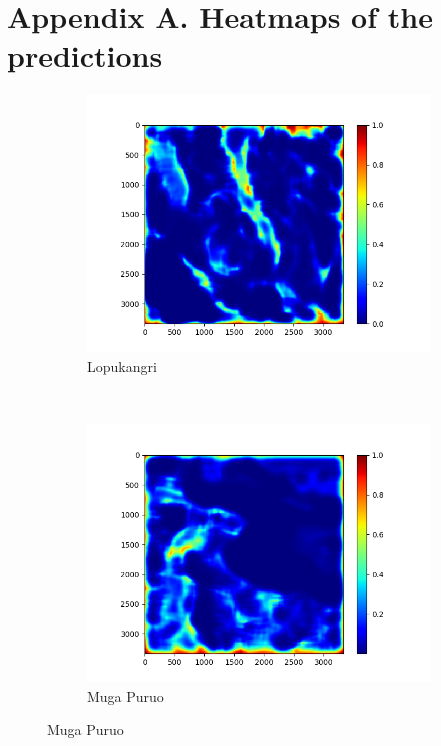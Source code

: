 \documentclass[11pt,a4paper]{article}
\begin{document}
\printbibliography

\section{Appendix A. Heatmaps of the predictions}
\begin{figure}[t]
    \centering
    \begin{subfigure}[b]{0.45\textwidth}
        \includegraphics[width=\textwidth]{graphics/training/train_on_01_features_01234/heatmaps_faults_0.png}
        \caption{Lopukangri}
        \label{fig:heatmaps_2_Lopukangri}
    \end{subfigure}
    ~
    \begin{subfigure}[b]{0.45\textwidth}
        \includegraphics[width=\textwidth]{graphics/training/train_on_01_features_01234/heatmaps_faults_1.png}
        \caption{Muga Puruo}
        \label{fig:heatmaps_2_Muga_Puruo}
    \end{subfigure}


\end{figure}
\end{document}
